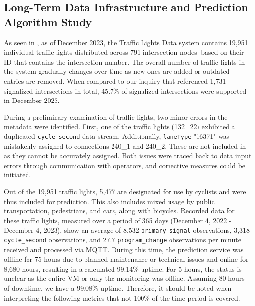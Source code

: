 \subsection{Long-Term Data Infrastructure and Prediction Algorithm Study}

As seen in , as of December 2023, the Traffic Lights Data system contains 19,951 individual traffic lights distributed across 791 intersection nodes, based on their ID that contains the intersection number. The overall number of traffic lights in the system gradually changes over time as new ones are added or outdated entries are removed. When compared to our inquiry that referenced 1,731 signalized intersections in total, 45.7\% of signalized intersections were supported in December 2023.

During a preliminary examination of traffic lights, two minor errors in the metadata were identified. First, one of the traffic lights (132\_22) exhibited a duplicated \texttt{cycle\_second} data stream. Additionally, \texttt{laneType} "16371" was mistakenly assigned to connections 240\_1 and 240\_2. These are not included in  as they cannot be accurately assigned. Both issues were traced back to data input errors through communication with operators, and corrective measures could be initiated.

Out of the 19,951 traffic lights, 5,477 are designated for use by cyclists and were thus included for prediction. This also includes mixed usage by public transportation, pedestrians, and cars, along with bicycles. Recorded data for these traffic lights, measured over a period of 365 days (December 4, 2022 - December 4, 2023), show an average of 8,532 \texttt{primary\_signal} observations, 3,318 \texttt{cycle\_second} observations, and 27.7 \texttt{program\_change} observations per minute received and processed via MQTT. During this time, the prediction service was offline for 75 hours due to planned maintenance or technical issues and online for 8,680 hours, resulting in a calculated 99.14\% uptime. For 5 hours, the status is unclear as the entire VM or only the monitoring was offline. Assuming 80 hours of downtime, we have a 99.08\% uptime. Therefore, it should be noted when interpreting the following metrics that not 100\% of the time period is covered.


